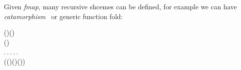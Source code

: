 Given \emph{fmap}, many recursive shcemes can be defined, for example
we can have \emph{catamorphism}~\cite{Meijer1991} 
 or generic function fold:
\begin{hscode}\SaveRestoreHook
{}%
%
%
%
%
%
\>[3]{}\;\mathbin{:}{}\<[18]%
\>[18]{}(\mathbin{:}\star\to \star)\to (\mathbin{:}\star)\to {}\<[E]%
\\
\>[18]{}\;\to (\;\to {})\to {}\;\to {}\mathrel{=}{}\<[E]%
\\
\>[3]{}\<[5]%
\>[5]{}\lambda {}\mathbin{:}\star\to \star.\,\lambda {}\mathbin{:}\star.\,\lambda {}\mathbin{:}\;.\,\lambda {}\mathbin{:}\;\to {}.\,\lambda {}\mathbin{:}\;.\,{}\<[E]%
\\
\>[5]{}\<[7]%
\>[7]{}\;(\;\;\;(\;)\;\;(\;\;\;\;)\;(\;\;)){}\<[E]%
\ColumnHook
\end{hscode}\resethooks
